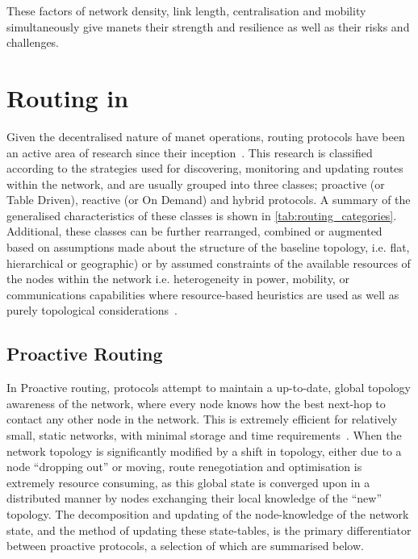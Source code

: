 These factors of network density, link length, centralisation and mobility simultaneously give \glspl{manet} their strength and resilience as well as their risks and challenges.


\section{Routing in }\label{sec:manet_routing}

{\titlespacing{\subsubsection}{0pt}{\parskip}{\parskip}
	
Given the decentralised nature of \gls{manet} operations, routing protocols have been an active area of research since their inception~\cite{Jubin1987}.
This research is classified according to the strategies used for discovering, monitoring and updating routes within the network, and are usually grouped into three classes; proactive (or Table Driven), reactive (or On Demand) and hybrid protocols.
A summary of the generalised characteristics of these classes is shown in \autoref{tab:routing_categories}.
Additional, these classes can be further rearranged, combined or augmented based on assumptions made about the structure of the baseline topology, i.e. flat, hierarchical or geographic) or by assumed constraints of the available resources of the nodes within the network i.e. heterogeneity in power, mobility, or communications capabilities where resource-based heuristics are used as well as purely topological considerations~\cite{Li2005,Gerla2002}.

\subsection{Proactive Routing}

In Proactive routing, protocols attempt to maintain a up-to-date, global topology awareness of the network, where every node knows how the best next-hop to contact any other node in the network.
This is extremely efficient for relatively small, static networks, with minimal storage and time requirements~\cite{Mbarushimana2007}.
When the network topology is significantly modified by a shift in topology, either due to a node ``dropping out'' or moving, route renegotiation and optimisation is extremely resource consuming, as this global state is converged upon in a distributed manner by nodes exchanging their local knowledge of the ``new'' topology.
The decomposition and updating of the node-knowledge of the network state, and the method of updating these state-tables, is the primary differentiator between proactive protocols, a selection of which are summarised below.

}
